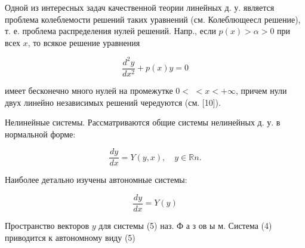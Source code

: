 \documentclass[10pt]{article}
\begin{document}
Одной из интересных задач качественной теории линейных д. у. является проблема колеблемости решений таких уравнений (см. Колеблющеесл решение), т. е. проблема распределения нулей решений. Напр., если $p(x)>\alpha>0$ при всех $x$, то всякое решение уравнения



\[

\frac{d^{2} y}{d x^{2}}+p(x) y=0

\]



имеет бесконечно много нулей на промежутке $0<$ $<x<+\infty$, причем нули двух линейно независимых решений чередуются (см. [10]).



Нелинейные системы. Рассматриваются общие системы нелинейных д. у. в нормальной форме:



\[

\frac{d y}{d x}=Y(y, x), \quad y \in \mathbb{R} n .

\]



Наиболее детально изучены автономные системы:



\[

\frac{d y}{d x}=Y(y)

\]



Пространство векторов $y$ для системы (5) наз. Ф а з ов ы м. Система (4) приводится к автономному виду (5)
\end{document}
